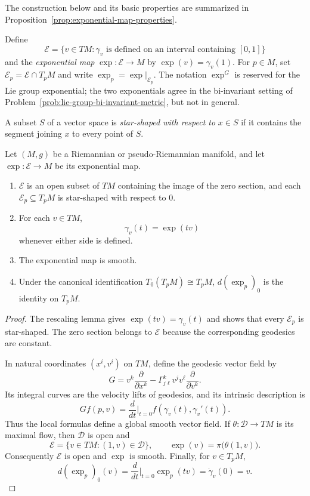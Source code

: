 The construction below and its basic properties are summarized in
Proposition~\ref{prop:exponential-map-properties}.

Define
\[
\mathcal E=\{v\in TM:\gamma_v\text{ is defined on an interval containing }[0,1]\}
\]
and the \emph{exponential map} $\exp:\mathcal E\to M$ by
$\exp(v)=\gamma_v(1)$.  For $p\in M$, set
$\mathcal E_p=\mathcal E\cap T_pM$ and write
$\exp_p=\exp|_{\mathcal E_p}$.  The notation $\exp^G$ is reserved for the Lie
group exponential; the two exponentials agree in the bi-invariant setting of
Problem~\ref{prob:lie-group-bi-invariant-metric}, but not in general.

A subset $S$ of a vector space is \emph{star-shaped with respect to} $x\in S$
if it contains the segment joining $x$ to every point of $S$.

\begin{proposition}
\label{prop:exponential-map-properties}

Let $(M, g)$ be a Riemannian or pseudo-Riemannian manifold, and let
$\exp: \mathcal{E} \to M$ be its exponential map.
\begin{enumerate}[label=(\alph*)]
\item $\mathcal{E}$ is an open subset of $TM$ containing the image of the zero
section, and each $\mathcal{E}_p \subseteq T_p M$ is star-shaped with respect
to $0$.
\item For each $v \in TM$,
\begin{equation}
\gamma_v(t) = \exp(tv) \tag{5.17}
\end{equation}
whenever either side is defined.
\item The exponential map is smooth.
\item Under the canonical identification $T_0(T_pM)\cong T_pM$,
$d(\exp_p)_0$ is the identity on $T_pM$.
\end{enumerate}

\begin{proof}
\sketch
The rescaling lemma gives $\exp(tv)=\gamma_v(t)$ and shows that every
$\mathcal E_p$ is star-shaped.  The zero section belongs to $\mathcal E$
because the corresponding geodesics are constant.

In natural coordinates $(x^i,v^i)$ on $TM$, define the geodesic vector field
by
\[
G=v^k\frac{\partial}{\partial x^k}
-\Gamma^k_{j\ell}v^jv^\ell\frac{\partial}{\partial v^k}.
\]
Its integral curves are the velocity lifts of geodesics, and its intrinsic
description is
\begin{equation}
Gf(p,v) = \frac{d}{dt}\bigg|_{t=0}
f(\gamma_v(t), \gamma_v'(t)). \tag{5.18}
\end{equation}
Thus the local formulas define a global smooth vector field.  If
$\theta:\mathcal D\to TM$ is its maximal flow, then $\mathcal D$ is open and
\[
\mathcal E=\{v\in TM:(1,v)\in\mathcal D\},
\qquad
\exp(v)=\pi\bigl(\theta(1,v)\bigr).
\]
Consequently $\mathcal E$ is open and $\exp$ is smooth.  Finally, for
$v\in T_pM$,
\[
d(\exp_p)_0(v)
=\frac{d}{dt}\bigg|_{t=0}\exp_p(tv)
=\dot\gamma_v(0)=v.
\]
\end{proof}
\end{proposition}

